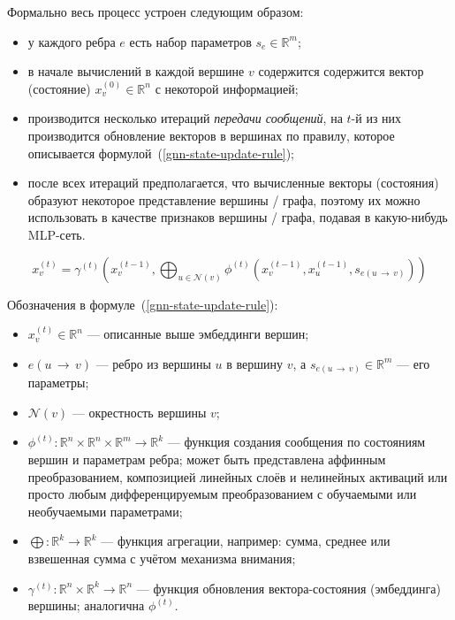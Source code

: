 Формально весь процесс устроен следующим образом:

\begin{itemize}
    \item у каждого ребра $e$ есть набор параметров $s_e \in \mathbb{R}^m$;
    \item в начале вычислений в каждой вершине $v$ содержится содержится вектор (состояние) $x_v^{(0)} \in \mathbb{R}^n$ с некоторой информацией;
    \item производится несколько итераций \textit{передачи сообщений}, на $t$-й из них производится обновление векторов в вершинах по правилу, которое описывается формулой~(\ref{gnn-state-update-rule});
    \item после всех итераций предполагается, что вычисленные векторы (состояния) образуют некоторое представление вершины / графа, поэтому их можно использовать в качестве признаков вершины / графа, подавая в какую-нибудь MLP-сеть.
\end{itemize}

\begin{equation} \label{gnn-state-update-rule}
    x_v^{(t)} = \gamma^{(t)} \left(x_v^{(t - 1)}, \bigoplus_{u \in \mathcal{N}(v)} \phi^{(t)} \left(x_v^{(t - 1)}, x_u^{(t - 1)}, s_{e(u \, \to \, v)} \right) \right)
\end{equation}

Обозначения в формуле~(\ref{gnn-state-update-rule}):

\begin{itemize}
    \item $x_v^{(t)} \in \mathbb{R}^n$ --- описанные выше эмбеддинги вершин;
    \item $e(u \, \to \, v)$ --- ребро из вершины $u$ в вершину $v$, а $s_{e(u \, \to \, v)} \in \mathbb{R}^m$ --- его параметры;
    \item $\mathcal{N}(v)$ --- окрестность вершины $v$;
    \item $\phi^{(t)}: \mathbb{R}^n \times \mathbb{R}^n \times \mathbb{R}^m \to \mathbb{R}^k$ --- функция создания сообщения по состояниям вершин и параметрам ребра; может быть представлена аффинным преобразованием, композицией линейных слоёв и нелинейных активаций или просто любым дифференцируемым преобразованием с обучаемыми или необучаемыми параметрами;
    \item $\bigoplus: \mathbb{R}^k \to \mathbb{R}^k$ --- функция агрегации, например: сумма, среднее или взвешенная сумма с учётом механизма внимания;
    \item $\gamma^{(t)}: \mathbb{R}^n \times \mathbb{R}^k \to \mathbb{R}^n$ --- функция обновления вектора-состояния (эмбеддинга) вершины; аналогична $\phi^{(t)}$.
\end{itemize}

